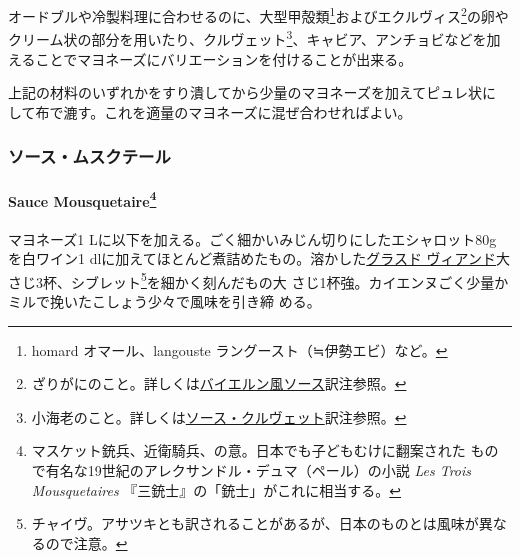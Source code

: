 \begin{recette}

オードブルや冷製料理に合わせるのに、大型甲殻類\footnote{homard
  オマール、langouste ラングースト（≒伊勢エビ）など。}およびエクルヴィス\footnote{ざりがにのこと。詳しくは\protect\hyperlink{sauce-bavaroise}{バイエルン風ソース}訳注参照。}の卵や
クリーム状の部分を用いたり、クルヴェット\footnote{小海老のこと。詳しくは\protect\hyperlink{sauce-aux-crevettes}{ソース・クルヴェット}訳注参照。}、キャビア、アンチョビなどを加
えることでマヨネーズにバリエーションを付けることが出来る。

上記の材料のいずれかをすり潰してから少量のマヨネーズを加えてピュレ状に
して布で漉す。これを適量のマヨネーズに混ぜ合わせればよい。

\maeaki

\hypertarget{ux30bdux30fcux30b9ux30e0ux30b9ux30afux30c6ux30fcux30eb}{%
\subsubsection{ソース・ムスクテール}\label{ux30bdux30fcux30b9ux30e0ux30b9ux30afux30c6ux30fcux30eb}}

\hypertarget{sauce-mousquetaire}{%
\paragraph[Sauce Mousquetaire]{\texorpdfstring{Sauce
Mousquetaire\footnote{マスケット銃兵、近衛騎兵、の意。日本でも子どもむけに翻案された
  もので有名な19世紀のアレクサンドル・デュマ（ペール）の小説 \emph{Les
  Trois Mousquetaires} 『三銃士』の「銃士」がこれに相当する。}}{Sauce Mousquetaire}}\label{sauce-mousquetaire}}


マヨネーズ1 Lに以下を加える。ごく細かいみじん切りにしたエシャロット80g
を白ワイン1\undemi{}
dlに加えてほとんど煮詰めたもの。溶かした\protect\hyperlink{glace-de-viande}{グラスド
ヴィアンド}大さじ3杯、シブレット\footnote{チャイヴ。アサツキとも訳されることがあるが、日本のものとは風味が異なるので注意。}を細かく刻んだもの大
さじ1杯強。カイエンヌごく少量かミルで挽いたこしょう少々で風味を引き締
める。


\end{recette}
